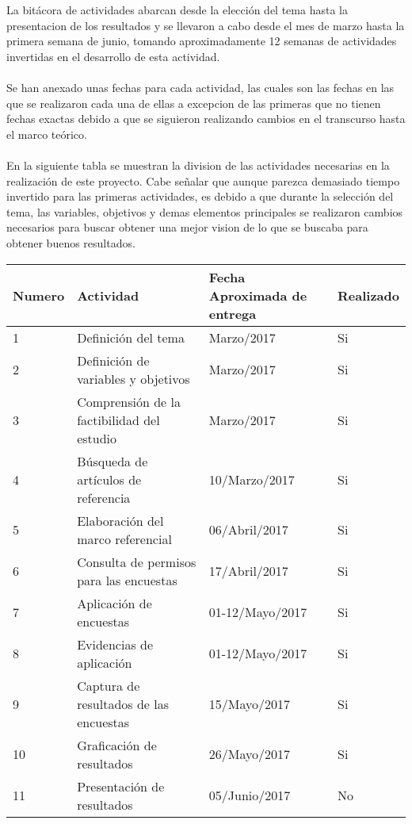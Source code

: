 \documentclass [a4paper, 12pt]{report}
\begin{document}
La bitácora de actividades abarcan desde la elección del tema hasta la presentacion de los resultados y se llevaron a cabo desde el mes de marzo hasta la primera semana de junio, tomando aproximadamente 12 semanas de actividades invertidas en el desarrollo de esta actividad. \\
\\

Se han anexado unas fechas para cada actividad, las cuales son las fechas en las que se realizaron cada una de ellas a excepcion de las primeras que no tienen fechas exactas debido a que se siguieron realizando cambios en el transcurso hasta el marco teórico. \\
\\

En la siguiente tabla se muestran la division de las actividades necesarias en la realización de este proyecto. Cabe señalar que aunque parezca demasiado tiempo invertido para las primeras actividades, es debido a que durante la selección del tema, las variables, objetivos y demas elementos principales se realizaron cambios necesarios para buscar obtener una mejor vision de lo que se buscaba para obtener buenos resultados. \\
\begin{table*}[h]
		\begin{tabular}{||p{1.5cm}|p{4cm}|p{4cm}|p{1.5cm}||}
\hline		
\hline
Numero  & Actividad & Fecha Aproximada de entrega & Realizado  \\
\hline
1 & Definición del tema & Marzo/2017 & Si   \\ \hline
2 & Definición de variables y objetivos           & Marzo/2017  & Si \\ \hline
3 & Comprensión de la factibilidad del estudio    & Marzo/2017 & Si   \\ \hline
4 & Búsqueda de artículos de referencia    & 10/Marzo/2017 & Si   \\ \hline
5 & Elaboración del marco referencial        & 06/Abril/2017  & Si  \\ \hline
6 & Consulta de permisos para las encuestas     & 17/Abril/2017 & Si \\ \hline
7 & Aplicación de encuestas       & 01-12/Mayo/2017 & Si  \\ \hline
8 & Evidencias de aplicación      &  01-12/Mayo/2017 & Si  \\ \hline
9 & Captura de resultados de las encuestas      &  15/Mayo/2017  & Si \\ \hline
10 & Graficación de resultados      & 26/Mayo/2017 & Si \\ \hline
11 & Presentación de resultados      & 05/Junio/2017 & No \\
		\hline
		\hline
		\end{tabular}	
\end{table*}
\\
\\
\\
\\
\\
\\
\\
\\
\\
\\
\\
\end{document}
